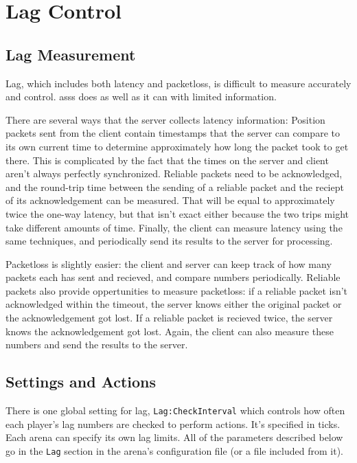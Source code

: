\documentclass{article}
\newcommand{\asss}{asss}
\begin{document}
\section{Lag Control}

\subsection{Lag Measurement}

Lag, which includes both latency and packetloss, is difficult to measure
accurately and control. \asss{} does as well as it can with limited
information.

There are several ways that the server collects latency information:
Position packets sent from the client contain timestamps that the server
can compare to its own current time to determine approximately how long
the packet took to get there. This is complicated by the fact that the
times on the server and client aren't always perfectly synchronized.
Reliable packets need to be acknowledged, and the round-trip time
between the sending of a reliable packet and the reciept of its
acknowledgement can be measured. That will be equal to approximately
twice the one-way latency, but that isn't exact either because the two
trips might take different amounts of time. Finally, the client can
measure latency using the same techniques, and periodically send its
results to the server for processing.

Packetloss is slightly easier: the client and server can keep track of
how many packets each has sent and recieved, and compare numbers
periodically. Reliable packets also provide oppertunities to measure
packetloss: if a reliable packet isn't acknowledged within the timeout,
the server knows either the original packet or the acknowledgement got
lost. If a reliable packet is recieved twice, the server knows the
acknowledgement got lost. Again, the client can also measure these
numbers and send the results to the server.

\subsection{Settings and Actions}

There is one global setting for lag, \texttt{Lag:CheckInterval} which
controls how often each player's lag numbers are checked to perform
actions. It's specified in ticks. Each arena can specify its own lag
limits. All of the parameters described below go in the \texttt{Lag}
section in the arena's configuration file (or a file included from it).
\end{document}
